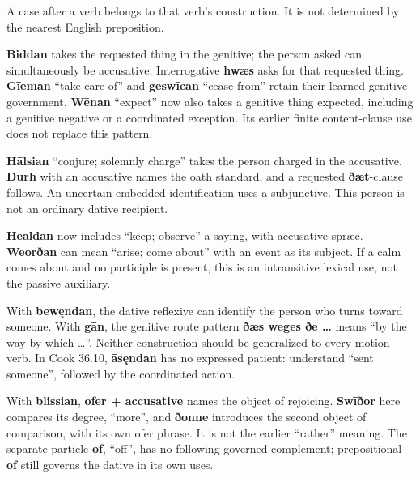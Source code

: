 A case after a verb belongs to that verb’s construction. It is not determined by the nearest English preposition.

\textbf{Biddan} takes the requested thing in the genitive; the person asked can simultaneously be accusative. Interrogative \textbf{hwæs} asks for that requested thing. \textbf{Gīeman} “take care of” and \textbf{geswīcan} “cease from” retain their learned genitive government. \textbf{Wēnan} “expect” now also takes a genitive thing expected, including a genitive negative or a coordinated exception. Its earlier finite content-clause use does not replace this pattern.

\textbf{Hālsian} “conjure; solemnly charge” takes the person charged in the accusative. \textbf{Ðurh} with an accusative names the oath standard, and a requested \textbf{ðæt}-clause follows. An uncertain embedded identification uses a subjunctive. This person is not an ordinary dative recipient.

\textbf{Healdan} now includes “keep; observe” a saying, with accusative sprǣc. \textbf{Weorðan} can mean “arise; come about” with an event as its subject. If a calm comes about and no participle is present, this is an intransitive lexical use, not the passive auxiliary.

With \textbf{bewęndan}, the dative reflexive can identify the person who turns toward someone. With \textbf{gān}, the genitive route pattern \textbf{ðæs weges ðe …} means “by the way by which …”. Neither construction should be generalized to every motion verb. In Cook 36.10, \textbf{āsęndan} has no expressed patient: understand “sent someone”, followed by the coordinated action.

With \textbf{blissian}, \textbf{ofer + accusative} names the object of rejoicing. \textbf{Swīðor} here compares its degree, “more”, and \textbf{ðonne} introduces the second object of comparison, with its own ofer phrase. It is not the earlier “rather” meaning. The separate particle \textbf{of}, “off”, has no following governed complement; prepositional \textbf{of} still governs the dative in its own uses.

